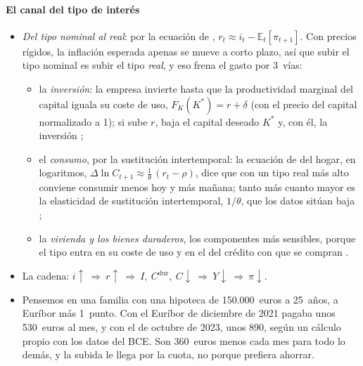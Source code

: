 \documentclass[11pt]{article}
\begin{document}
\paragraph{El canal del tipo de interés}
\begin{itemize}
\item \emph{Del tipo nominal al real}: por la ecuación de , $r_t\approx i_t-\mathbb{E}_t[\pi_{t+1}]$. Con precios rígidos, la inflación esperada apenas se mueve a corto plazo, así que subir el tipo nominal es subir el tipo \emph{real}, y eso frena el gasto por 3~vías:
  \begin{itemize}
  \item la \emph{inversión}: la empresa invierte hasta que la productividad marginal del capital iguala su coste de uso\nocite{Jorgenson1963Capital}, $F_K(K^*)=r+\delta$ (con el precio del capital normalizado a 1); si sube $r$, baja el capital deseado $K^*$ y, con él, la inversión ;
  \item el \emph{consumo}, por la sustitución intertemporal: la ecuación de  del hogar, en logaritmos, $\Delta\ln C_{t+1}\approx\frac{1}{\theta}\,(r_t-\rho)$, dice que con un tipo real más alto conviene consumir menos hoy y más mañana; tanto más cuanto mayor es la elasticidad de sustitución intertemporal, $1/\theta$, que los datos sitúan baja  ;
  \item la \emph{vivienda y los bienes duraderos}, los componentes más sensibles, porque el tipo entra en su coste de uso y en el del crédito con que se compran .
  \end{itemize}
\item La cadena: $i\uparrow\ \Rightarrow\ r\uparrow\ \Rightarrow\ I,\ C^{\mathrm{dur}},\ C\downarrow\ \Rightarrow\ Y\downarrow\ \Rightarrow\ \pi\downarrow$.
\item Pensemos en una familia con una hipoteca de 150.000~euros a 25~años, a Euríbor más 1~punto. Con el Euríbor de diciembre de 2021 pagaba unos 530~euros al mes, y con el de octubre de 2023, unos 890, según un cálculo propio con los datos del BCE\nocite{BCE2026FMEuribor}. Son 360~euros menos cada mes para todo lo demás, y la subida le llega por la cuota, no porque prefiera ahorrar.
\end{itemize}
\end{document}
